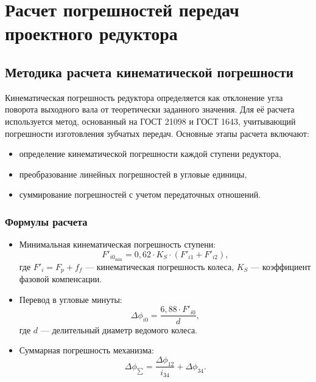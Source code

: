 \section{Расчет погрешностей передач проектного редуктора}
\subsection{Методика расчета кинематической погрешности}

Кинематическая погрешность редуктора определяется как отклонение угла поворота выходного вала от теоретически заданного значения. 
Для её расчета используется метод, основанный на ГОСТ 21098 и ГОСТ 1643, учитывающий погрешности изготовления зубчатых передач. Основные этапы расчета включают:
\begin{itemize}
    \item определение кинематической погрешности каждой ступени редуктора,
    \item преобразование линейных погрешностей в угловые единицы,
    \item суммирование погрешностей с учетом передаточных отношений.
\end{itemize}

\subsubsection{Формулы расчета}
 \begin{itemize}
      \item Минимальная кинематическая погрешность ступени:
    \begin{equation}
        F'_{i0_{\text{min}}} = 0,62 \cdot K_S \cdot (F'_{i1} + F'_{i2}),
    \end{equation}
      где \( F'_i = F_p + f_f \) — кинематическая погрешность колеса, \( K_S \) — коэффициент фазовой компенсации.
    \item Перевод в угловые минуты:
    \begin{equation}
        \Delta\phi_{i0} = \frac{6,88 \cdot F'_{i0}}{d},
    \end{equation}
        где \( d \) — делительный диаметр ведомого колеса.
    \item Суммарная погрешность механизма:
        \begin{equation}
            \Delta\phi_{\sum} = \frac{\Delta\phi_{12}}{i_{34}} + \Delta\phi_{34}.
            \label{eq:deltaphi}
        \end{equation}
 \end{itemize}

